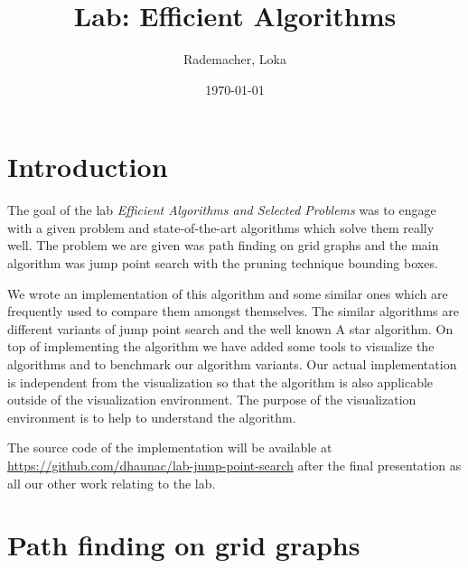 \documentclass{article}
\begin{document}
    \title{Lab: Efficient Algorithms}
    \author{Rademacher, Loka}
    \date{\today}

    \thispagestyle{empty}
    \begin{center}
        \noindent
        \makebox[0pt][r]{\thedate}
        
        
        \noindent
        \centerline{\huge \sc \thetitle}
        
        \vspace*{-2pt}
        
        \noindent
        \centerline{\large {\theauthor}}
    \end{center}
    
    
    
    \section{Introduction}
    
    The goal of the lab \textit{Efficient Algorithms and Selected Problems} was to engage with a given problem and state-of-the-art algorithms which solve them really well. The problem we are given was path finding on grid graphs and the main algorithm was jump point search with the pruning technique bounding boxes.
    
    We wrote an implementation of this algorithm and some similar ones which are frequently used to compare them amongst themselves. The similar algorithms are different variants of jump point search and the well known A star algorithm. On top of implementing the algorithm we have added some tools to visualize the algorithms and to benchmark our algorithm variants. Our actual implementation is independent from the visualization so that the algorithm is also applicable outside of the visualization environment. The purpose of the visualization environment is to help to understand the algorithm.
    
    The source code of the implementation will be available at \url{https://github.com/dhaunac/lab-jump-point-search} after the final presentation as all our other work relating to the lab.
    
    
    
    \section{Path finding on grid graphs}
    
\end{document}
